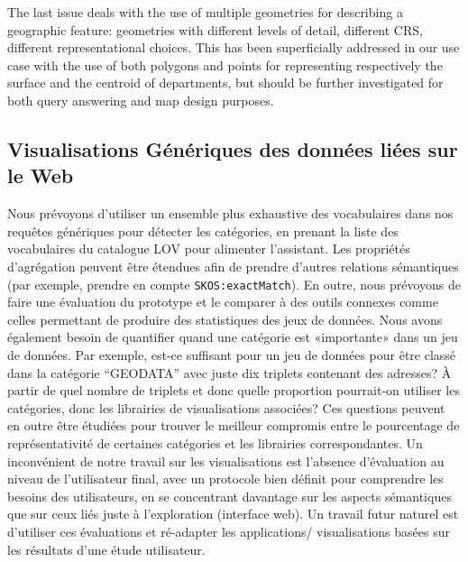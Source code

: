 \documentclass[a4paper,11pt,twoside]{report}
\begin{document}
The last issue deals with the use of multiple geometries for describing a geographic feature: geometries with different levels of detail, different CRS, different representational choices. This has been superficially addressed in our use case with the use of both polygons and points for representing respectively the surface and the centroid of departments, but should be further investigated for both query answering and map design purposes.


\subsection*{ Visualisations Génériques des données liées sur le Web}


Nous prévoyons d'utiliser un ensemble plus exhaustive des vocabulaires dans nos requêtes génériques pour détecter les catégories, en prenant la liste des vocabulaires du catalogue LOV pour alimenter l'assistant. Les propriétés d'agrégation peuvent être étendues afin de prendre d'autres relations sémantiques (par exemple, prendre en compte \texttt{SKOS:exactMatch}). En outre, nous prévoyons de faire une évaluation du prototype et le comparer à des outils connexes comme celles permettant de produire des statistiques des jeux de données. Nous avons également besoin de quantifier quand une catégorie est «importante» dans un jeu de données. Par exemple, est-ce suffisant pour un jeu de données pour être classé dans la catégorie ``GEODATA'' avec juste dix triplets contenant des adresses? À partir de quel nombre de triplets et donc quelle proportion pourrait-on utiliser les catégories, donc les librairies de visualisations associées? Ces questions peuvent en outre être étudiées pour trouver le meilleur compromis entre le pourcentage de représentativité de certaines catégories et les librairies correspondantes. Un  inconvénient de notre travail sur les visualisations est l'absence d'évaluation au niveau de l'utilisateur final, avec un protocole bien définit pour comprendre les besoins des utilisateurs, en se concentrant davantage sur les aspects sémantiques que sur ceux liés juste à l'exploration (interface web). Un travail futur naturel est d'utiliser ces évaluations et ré-adapter les applications/ visualisations basées sur les résultats d'une étude utilisateur.

 
\end{document}
